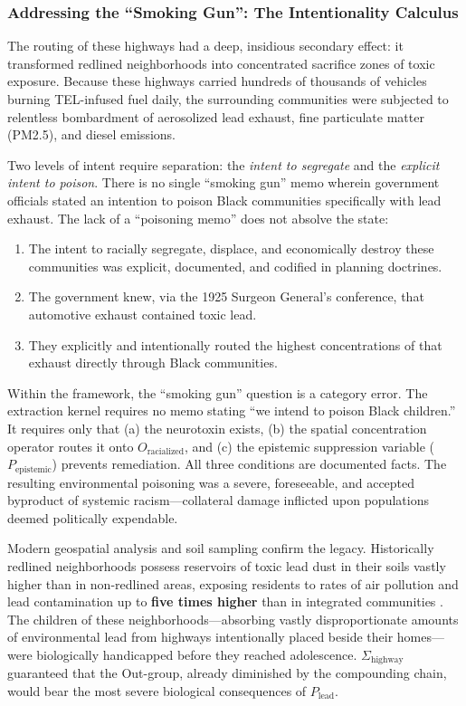 \subsubsection{Addressing the ``Smoking Gun'': The Intentionality Calculus}

The routing of these highways had a deep, insidious secondary effect: it transformed redlined neighborhoods into concentrated sacrifice zones of toxic exposure. Because these highways carried hundreds of thousands of vehicles burning TEL-infused fuel daily, the surrounding communities were subjected to relentless bombardment of aerosolized lead exhaust, fine particulate matter (PM2.5), and diesel emissions.

Two levels of intent require separation: the \textit{intent to segregate} and the \textit{explicit intent to poison}. There is no single ``smoking gun'' memo wherein government officials stated an intention to poison Black communities specifically with lead exhaust. The lack of a ``poisoning memo'' does not absolve the state:
\begin{enumerate}
\tightlist
\item The intent to racially segregate, displace, and economically destroy these communities was explicit, documented, and codified in planning doctrines.
\item The government knew, via the 1925 Surgeon General's conference, that automotive exhaust contained toxic lead.
\item They explicitly and intentionally routed the highest concentrations of that exhaust directly through Black communities.
\end{enumerate}

Within the framework, the ``smoking gun'' question is a category error. The extraction kernel requires no memo stating ``we intend to poison Black children.'' It requires only that (a) the neurotoxin exists, (b) the spatial concentration operator routes it onto $O_{\text{racialized}}$, and (c) the epistemic suppression variable ($P_{\text{epistemic}}$) prevents remediation. All three conditions are documented facts. The resulting environmental poisoning was a severe, foreseeable, and accepted byproduct of systemic racism---collateral damage inflicted upon populations deemed politically expendable.

Modern geospatial analysis and soil sampling confirm the legacy. Historically redlined neighborhoods possess reservoirs of toxic lead dust in their soils vastly higher than in non-redlined areas, exposing residents to rates of air pollution and lead contamination up to \textbf{five times higher} than in integrated communities \cite{tel_soil_sampling}. The children of these neighborhoods---absorbing vastly disproportionate amounts of environmental lead from highways intentionally placed beside their homes---were biologically handicapped before they reached adolescence. $\Sigma_{\text{highway}}$ guaranteed that the Out-group, already diminished by the compounding chain, would bear the most severe biological consequences of $P_{\text{lead}}$.

